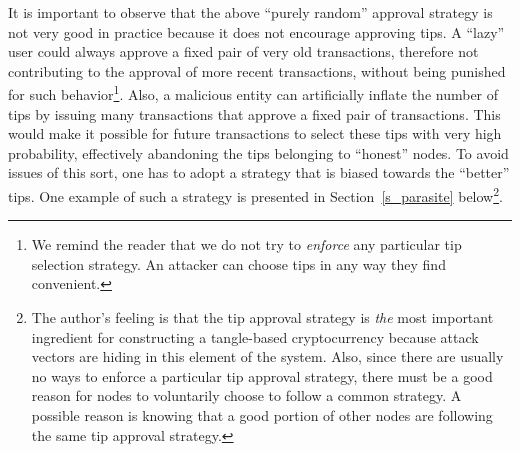 \documentclass[12pt]{article}
\begin{document}
It is important to observe
 that 
the above ``purely random'' approval 
strategy is not very good in practice 
because it does not encourage approving tips.
A ``lazy'' user could 
always approve a fixed 
pair
of very old transactions, therefore not contributing to the approval of 
more recent transactions,
without being punished for such behavior\footnote{We 
remind the reader that we do not try to \emph{enforce}
any particular tip selection strategy. An 
attacker can choose tips in any way they find convenient.}.
Also, a malicious entity can artificially inflate the number
of tips 
by issuing many transactions that approve
a fixed pair of transactions. 
This would make it possible for future transactions to
select these tips with very high probability, effectively
 abandoning the tips belonging to ``honest'' nodes.
To avoid issues of this sort, one has to adopt a
strategy that is biased towards the ``better'' tips.
One example of such a strategy is presented in Section~\ref{s_parasite}
below\footnote{The author's feeling is that the tip approval 
strategy is \emph{the} most important ingredient for 
constructing a tangle-based cryptocurrency because 
attack vectors are hiding in this element of the system.
 Also, since there are usually no ways to 
enforce a particular tip approval strategy, there must be a 
good reason for nodes to voluntarily choose to follow a common 
strategy. A possible reason is knowing that a good portion of other 
nodes are following the same tip approval strategy. 
}.
\end{document}
